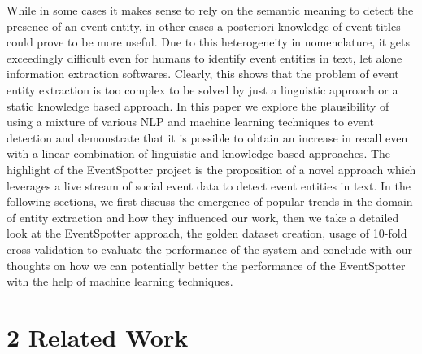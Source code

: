 \documentclass[a4paper,11pt]{report}
\begin{document}
While in some cases it makes sense to rely on the semantic meaning to detect the presence of an event entity, in other cases a posteriori knowledge of event titles could prove to be more useful.  Due to this heterogeneity in nomenclature, it gets exceedingly difficult even for humans to identify event entities in text, let alone information extraction softwares.  Clearly, this shows that the problem of event entity extraction is too complex to be solved by just a linguistic approach or a static knowledge based approach. In this paper we explore the plausibility of using a mixture of various NLP and machine learning techniques to event detection and demonstrate that it is possible to obtain an increase in recall even with a linear combination of linguistic and knowledge based approaches. The highlight of the EventSpotter project is the proposition of a novel approach which leverages a live stream of social event data to detect event entities in text. In the following sections, we first discuss the emergence of popular trends in the domain of entity extraction and how they influenced our work, then we take a detailed look at the EventSpotter approach, the golden dataset creation, usage of 10-fold cross validation to evaluate the performance of the system and conclude with our thoughts on how we can potentially better the performance of the EventSpotter with the help of machine learning techniques.

\chapter*{2 Related Work}
\end{document}

